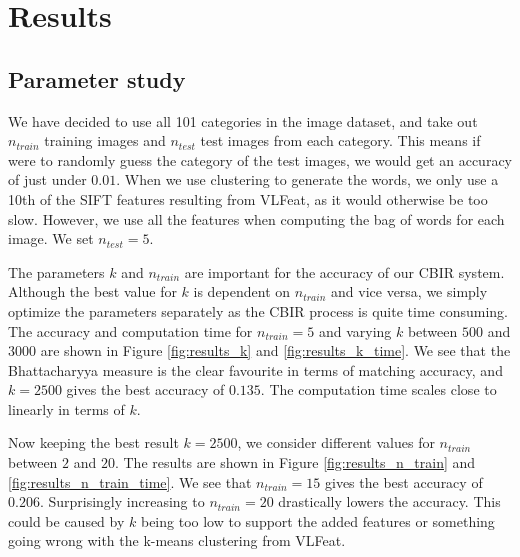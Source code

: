 \documentclass[11pt,a4paper]{article}
\begin{document}
\section{Results}

\subsection{Parameter study}

We have decided to use all 101 categories in the image dataset, and take out $n_{train}$ training images and $n_{test}$ test images from each category. This means if were to randomly guess the category of the test images, we would get an accuracy of just under $0.01$. When we use clustering to generate the words, we only use a 10th of the SIFT features resulting from VLFeat, as it would otherwise be too slow. However, we use all the features when computing the bag of words for each image. We set $n_{test} = 5$.

The parameters $k$ and $n_{train}$ are important for the accuracy of our CBIR system. Although the best value for $k$ is dependent on $n_{train}$ and vice versa, we simply optimize the parameters separately as the CBIR process is quite time consuming. The accuracy and computation time for $n_{train} = 5$ and varying $k$ between $500$ and $3000$ are shown in Figure \ref{fig:results_k} and \ref{fig:results_k_time}. We see that the Bhattacharyya measure is the clear favourite in terms of matching accuracy, and $k = 2500$ gives the best accuracy of $0.135$. The computation time scales close to linearly in terms of $k$.

Now keeping the best result $k = 2500$, we consider different values for $n_{train}$ between $2$ and $20$. The results are shown in Figure \ref{fig:results_n_train} and \ref{fig:results_n_train_time}. We see that $n_{train} = 15$ gives the best accuracy of $0.206$. Surprisingly increasing to $n_{train} = 20$ drastically lowers the accuracy. This could be caused by $k$ being too low to support the added features or something going wrong with the k-means clustering from VLFeat.
\end{document}
